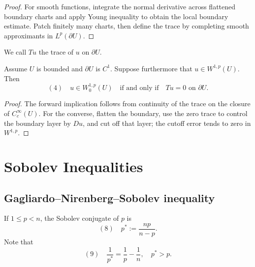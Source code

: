 \begin{proof}
\sketch For smooth functions, integrate the normal derivative across flattened boundary charts and apply Young inequality to obtain the local boundary estimate. Patch finitely many charts, then define the trace by completing smooth approximants in $L^p(\partial U)$.
\end{proof}

\begin{definition}
\label{def:trace-operator}

We call $Tu$ the trace of $u$ on $\partial U$.
\end{definition}

\begin{theorem}
\label{thm:trace-zero-characterization}

Assume $U$ is bounded and $\partial U$ is $C^1$. Suppose furthermore that $u \in W^{1,p}(U)$. Then
$$(4) \quad u \in W_0^{1,p}(U) \quad \text{if and only if} \quad Tu = 0 \text{ on } \partial U.$$
\end{theorem}

\begin{proof}
\sketch The forward implication follows from continuity of the trace on the closure of $C_c^\infty(U)$. For the converse, flatten the boundary, use the zero trace to control the boundary layer by $Du$, and cut off that layer; the cutoff error tends to zero in $W^{1,p}$.
\end{proof}

\section{Sobolev Inequalities}
\label{sec:sobolev-inequalities}

\subsection{Gagliardo--Nirenberg--Sobolev inequality}

\begin{definition}
\label{def:sobolev-conjugate-exponent}
If $1 \le p < n$, the Sobolev conjugate of $p$ is
$$(8) \quad p^* := \frac{np}{n - p}.$$
Note that
$$(9) \quad \frac{1}{p^*} = \frac{1}{p} - \frac{1}{n}, \quad p^* > p.$$
\end{definition}

